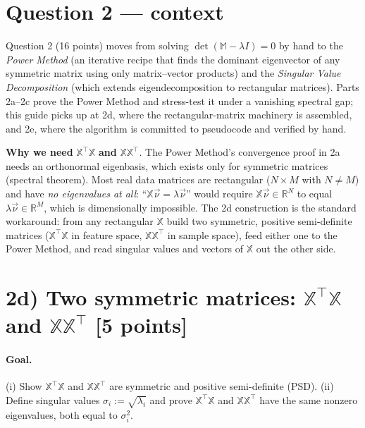\documentclass[12pt,a4paper]{article}
\newcommand{\M}{\mathbb{M}}
\newcommand{\vnu}{\vec{\nu}}
\begin{document}
\section*{Question 2 --- context}

Question 2 (16 points) moves from solving $\det(\M-\lambda I)=0$ by hand to the \emph{Power Method} (an iterative recipe that finds the dominant eigenvector of any symmetric matrix using only matrix--vector products) and the \emph{Singular Value Decomposition} (which extends eigendecomposition to rectangular matrices). Parts 2a--2c prove the Power Method and stress-test it under a vanishing spectral gap; this guide picks up at 2d, where the rectangular-matrix machinery is assembled, and 2e, where the algorithm is committed to pseudocode and verified by hand.

\begin{insight}
\textbf{Why we need }$\mathbb{X}^\top\mathbb{X}$\textbf{ and }$\mathbb{X}\mathbb{X}^\top$. The Power Method's convergence proof in 2a needs an orthonormal eigenbasis, which exists only for symmetric matrices (spectral theorem). Most real data matrices are rectangular ($N\times M$ with $N\ne M$) and have \emph{no eigenvalues at all}: ``$\mathbb{X}\vnu = \lambda\vnu$'' would require $\mathbb{X}\vnu \in \mathbb{R}^N$ to equal $\lambda\vnu \in \mathbb{R}^M$, which is dimensionally impossible. The 2d construction is the standard workaround: from any rectangular $\mathbb{X}$ build two symmetric, positive semi-definite matrices ($\mathbb{X}^\top\mathbb{X}$ in feature space, $\mathbb{X}\mathbb{X}^\top$ in sample space), feed either one to the Power Method, and read singular values and vectors of $\mathbb{X}$ out the other side.
\end{insight}

\section*{2d) Two symmetric matrices: $\mathbb{X}^\top\mathbb{X}$ and $\mathbb{X}\mathbb{X}^\top$ [5 points]}

\paragraph{Goal.} (i) Show $\mathbb{X}^\top\mathbb{X}$ and $\mathbb{X}\mathbb{X}^\top$ are symmetric and positive semi-definite (PSD). (ii) Define singular values $\sigma_i := \sqrt{\lambda_i}$ and prove $\mathbb{X}^\top\mathbb{X}$ and $\mathbb{X}\mathbb{X}^\top$ have the same nonzero eigenvalues, both equal to $\sigma_i^2$.
\end{document}
